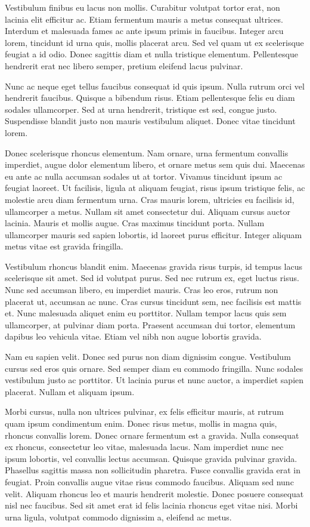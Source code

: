Vestibulum finibus eu lacus non mollis. Curabitur volutpat tortor erat, non lacinia elit efficitur ac. Etiam fermentum mauris a metus consequat ultrices. Interdum et malesuada fames ac ante ipsum primis in faucibus. Integer arcu lorem, tincidunt id urna quis, mollis placerat arcu. Sed vel quam ut ex scelerisque feugiat a id odio. Donec sagittis diam et nulla tristique elementum. Pellentesque hendrerit erat nec libero semper, pretium eleifend lacus pulvinar.

Nunc ac neque eget tellus faucibus consequat id quis ipsum. Nulla rutrum orci vel hendrerit faucibus. Quisque a bibendum risus. Etiam pellentesque felis eu diam sodales ullamcorper. Sed at urna hendrerit, tristique est sed, congue justo. Suspendisse blandit justo non mauris vestibulum aliquet. Donec vitae tincidunt lorem.

Donec scelerisque rhoncus elementum. Nam ornare, urna fermentum convallis imperdiet, augue dolor elementum libero, et ornare metus sem quis dui. Maecenas eu ante ac nulla accumsan sodales ut at tortor. Vivamus tincidunt ipsum ac feugiat laoreet. Ut facilisis, ligula at aliquam feugiat, risus ipsum tristique felis, ac molestie arcu diam fermentum urna. Cras mauris lorem, ultricies eu facilisis id, ullamcorper a metus. Nullam sit amet consectetur dui. Aliquam cursus auctor lacinia. Mauris et mollis augue. Cras maximus tincidunt porta. Nullam ullamcorper mauris sed sapien lobortis, id laoreet purus efficitur. Integer aliquam metus vitae est gravida fringilla.

Vestibulum rhoncus blandit enim. Maecenas gravida risus turpis, id tempus lacus scelerisque sit amet. Sed id volutpat purus. Sed nec rutrum ex, eget luctus risus. Nunc sed accumsan libero, eu imperdiet mauris. Cras leo eros, rutrum non placerat ut, accumsan ac nunc. Cras cursus tincidunt sem, nec facilisis est mattis et. Nunc malesuada aliquet enim eu porttitor. Nullam tempor lacus quis sem ullamcorper, at pulvinar diam porta. Praesent accumsan dui tortor, elementum dapibus leo vehicula vitae. Etiam vel nibh non augue lobortis gravida.

Nam eu sapien velit. Donec sed purus non diam dignissim congue. Vestibulum cursus sed eros quis ornare. Sed semper diam eu commodo fringilla. Nunc sodales vestibulum justo ac porttitor. Ut lacinia purus et nunc auctor, a imperdiet sapien placerat. Nullam et aliquam ipsum.

Morbi cursus, nulla non ultrices pulvinar, ex felis efficitur mauris, at rutrum quam ipsum condimentum enim. Donec risus metus, mollis in magna quis, rhoncus convallis lorem. Donec ornare fermentum est a gravida. Nulla consequat ex rhoncus, consectetur leo vitae, malesuada lacus. Nam imperdiet nunc nec ipsum lobortis, vel convallis lectus accumsan. Quisque gravida pulvinar gravida. Phasellus sagittis massa non sollicitudin pharetra. Fusce convallis gravida erat in feugiat. Proin convallis augue vitae risus commodo faucibus. Aliquam sed nunc velit. Aliquam rhoncus leo et mauris hendrerit molestie. Donec posuere consequat nisl nec faucibus. Sed sit amet erat id felis lacinia rhoncus eget vitae nisi. Morbi urna ligula, volutpat commodo dignissim a, eleifend ac metus.

